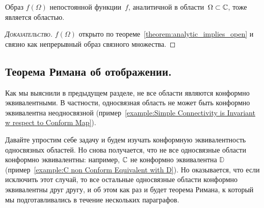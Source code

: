 \documentclass[../complex-analysis.tex]{subfiles}
\begin{document}
\begin{lm}
 \label{lemma:Analytic Image of a Region}
 Образ $ f(\Omega) $ непостоянной функции~$ f $, аналитичной в области~$ \Omega \subset \mathbb{C} $, тоже является областью.
\end{lm}
\begin{proof}[\normalfont\textsc{Доказательство}]
 $ f(\Omega) $ открыто по теореме~\ref{theorem:analytic_implies_open} и связно как непрерывный образ связного множества.
\end{proof}

\subsection{Теорема Римана об отображении.}

Как мы выяснили в предыдущем разделе, не все области являются конформно эквивалентными. В частности, односвязная область не может быть конформно эквивалентна неодносвязной (пример~\ref{example:Simple Connectivity is Invariant w respect to Conform Map}). 

Давайте упростим себе задачу и будем изучать конформную эквивалентность односвязных областей. Но снова получается, что не все односвязные области конформно эквивалентны: например, $ \mathbb{C} $ не конформно эквивалентна $ \mathbb D $ (пример~\ref{example:C non Conform Equivalent with D}). Но оказывается, что если исключить этот случай, то все остальные односвязные области конформно эквивалентны друг другу, и об этом как раз и будет теорема Римана, к который мы подготавливались в течение нескольких параграфов.
\end{document}
